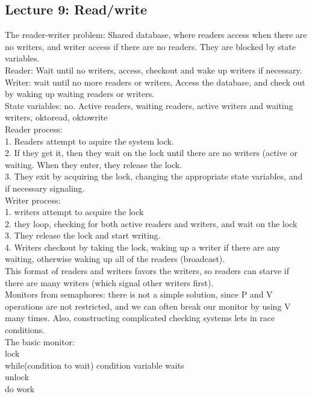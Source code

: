\documentclass[paper=a4, fontsize=11pt]{scrartcl} %
\numberwithin{equation}{section} %
\numberwithin{figure}{section} %
\numberwithin{table}{section} %
\def \tab {\hspace{.7cm}}
\begin{document}
\subsection{Lecture 9: Read/write}
The reader-writer problem: Shared database, where readers access when there are no writers, and writer access if there are no readers. They are blocked by state variables. \\
Reader: Wait until no writers, access, checkout and wake up writers if necessary. \\
Writer: wait until no more readers or writers, Access the database, and check out by waking up waiting readers or writers. \\
State variables: no. Active readers, waiting readers, active writers and waiting writers, oktoread, oktowrite\\
Reader process:\\
1. \tab Readers attempt to aquire the system lock.\\ 
2. \tab If they get it, then they wait on the lock until there are no writers (active or waiting. When they enter, they release the lock. \\
3. \tab They exit by acquiring the lock, changing the appropriate state variables, and if necessary signaling. \\
Writer process: \\
1. \tab writers attempt to acquire the lock \\
2. \tab they loop, checking for both active readers and writers, and wait on the lock\\
3. \tab They release the lock and start writing. \\
4. \tab Writers checkout by taking the lock, waking up a writer if there are any waiting, otherwise waking up all of the readers (broadcast).\\
This format of readers and writers favors the writers, so readers can starve if there are many writers (which signal other writers first).\\
Monitors from semaphores: there is not a simple solution, since P and V operations are not restricted, and we can often break our monitor by using V many times. Also, constructing complicated checking systems lets in race conditions. \\
The basic monitor: \\
lock\\
while(condition to wait) condition variable waits\\
unlock\\
do work \\
\end{document}
